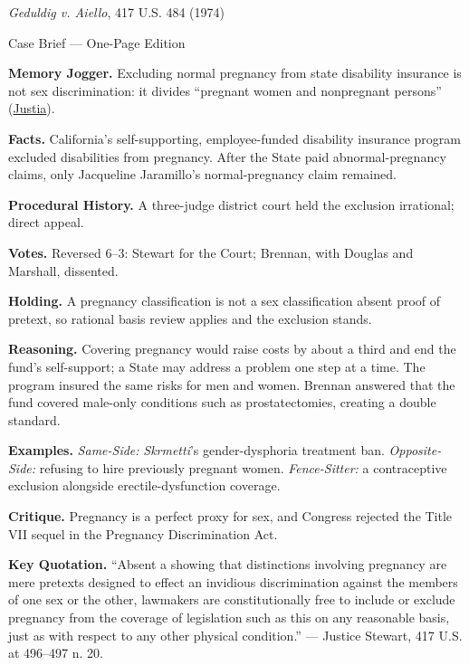 \documentclass[12pt]{article}
\begin{document}
\begin{center}
{\Large \textit{Geduldig v. Aiello}, 417 U.S. 484 (1974)\par}
\vspace{0.3em}
{\normalsize Case Brief --- One-Page Edition\par}
\end{center}

\textbf{Memory Jogger.} Excluding normal pregnancy from state disability insurance is not sex discrimination: it divides ``pregnant women and nonpregnant persons'' (\href{https://supreme.justia.com/cases/federal/us/417/484/}{Justia}).

\textbf{Facts.} California's self-supporting, employee-funded disability insurance program excluded disabilities from pregnancy. After the State paid abnormal-pregnancy claims, only Jacqueline Jaramillo's normal-pregnancy claim remained.

\textbf{Procedural History.} A three-judge district court held the exclusion irrational; direct appeal.

\textbf{Votes.} Reversed 6--3: Stewart for the Court; Brennan, with Douglas and Marshall, dissented.

\textbf{Holding.} A pregnancy classification is not a sex classification absent proof of pretext, so rational basis review applies and the exclusion stands.

\textbf{Reasoning.} Covering pregnancy would raise costs by about a third and end the fund's self-support; a State may address a problem one step at a time. The program insured the same risks for men and women. Brennan answered that the fund covered male-only conditions such as prostatectomies, creating a double standard.

\textbf{Examples.} \emph{Same-Side:} \textit{Skrmetti}'s gender-dysphoria treatment ban. \emph{Opposite-Side:} refusing to hire previously pregnant women. \emph{Fence-Sitter:} a contraceptive exclusion alongside erectile-dysfunction coverage.

\textbf{Critique.} Pregnancy is a perfect proxy for sex, and Congress rejected the Title VII sequel in the Pregnancy Discrimination Act.

\textbf{Key Quotation.} ``Absent a showing that distinctions involving pregnancy are mere pretexts designed to effect an invidious discrimination against the members of one sex or the other, lawmakers are constitutionally free to include or exclude pregnancy from the coverage of legislation such as this on any reasonable basis, just as with respect to any other physical condition.'' --- Justice Stewart, 417 U.S. at 496--497 n. 20.
\end{document}
